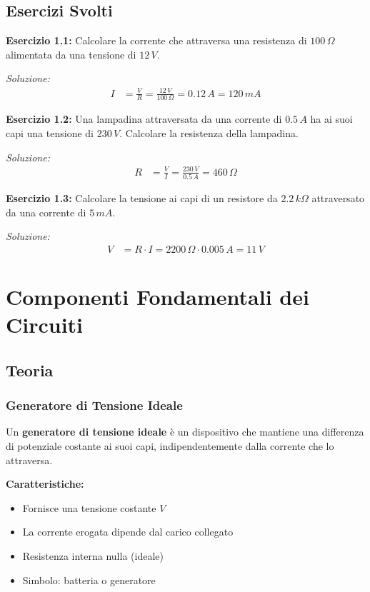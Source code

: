 \documentclass[a4paper,12pt]{article}
\begin{document}
\subsection{Esercizi Svolti}

\textbf{Esercizio 1.1:} Calcolare la corrente che attraversa una resistenza di $100\,\Omega$ alimentata da una tensione di $12\,V$.

\textit{Soluzione:}
\begin{align*}
I &= \frac{V}{R} = \frac{12\,V}{100\,\Omega} = 0.12\,A = 120\,mA
\end{align*}

\textbf{Esercizio 1.2:} Una lampadina attraversata da una corrente di $0.5\,A$ ha ai suoi capi una tensione di $230\,V$. Calcolare la resistenza della lampadina.

\textit{Soluzione:}
\begin{align*}
R &= \frac{V}{I} = \frac{230\,V}{0.5\,A} = 460\,\Omega
\end{align*}

\textbf{Esercizio 1.3:} Calcolare la tensione ai capi di un resistore da $2.2\,k\Omega$ attraversato da una corrente di $5\,mA$.

\textit{Soluzione:}
\begin{align*}
V &= R \cdot I = 2200\,\Omega \cdot 0.005\,A = 11\,V
\end{align*}

\newpage
\section{Componenti Fondamentali dei Circuiti}

\subsection{Teoria}

\subsubsection{Generatore di Tensione Ideale}

Un \textbf{generatore di tensione ideale} è un dispositivo che mantiene una differenza di potenziale costante ai suoi capi, indipendentemente dalla corrente che lo attraversa.

\textbf{Caratteristiche:}
\begin{itemize}
    \item Fornisce una tensione costante $V$
    \item La corrente erogata dipende dal carico collegato
    \item Resistenza interna nulla (ideale)
    \item Simbolo: batteria o generatore
\end{itemize}
\end{document}
